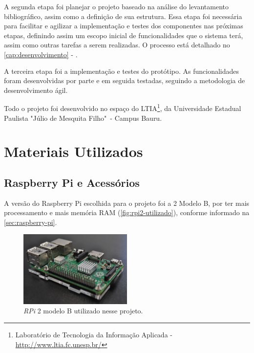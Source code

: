 \documentclass[
		12pt,				%
		openright,			%
		oneside,			%
		a4paper,			%
		chapter=TITLE,		%
		english,			%
		brazil				%
	]{abntex2}
\begin{document}
A segunda etapa foi planejar o projeto baseado na análise do levantamento bibliográfico, assim como a definição de sua estrutura. Essa etapa foi necessária para facilitar e agilizar a implementação e testes dos componentes nas próximas etapas, definindo assim um escopo inicial de funcionalidades que o sistema terá, assim como outras tarefas a serem realizadas. O processo está detalhado no \autoref{cap:desenvolvimento} - .

A terceira etapa foi a implementação e testes do protótipo. As funcionalidades foram desenvolvidas por parte e em seguida testadas, seguindo a metodologia de desenvolvimento ágil.

Todo o projeto foi desenvolvido no espaço do LTIA\footnote{Laboratório de Tecnologia da Informação Aplicada - \url{http://www.ltia.fc.unesp.br/}}, da Universidade Estadual Paulista "Júlio de Mesquita Filho"\ - Campus Bauru.


\section{Materiais Utilizados}\label{sec:materiais-utilizados}

\subsection{Raspberry Pi e Acessórios}\label{sec:rpi-acessorios}

A versão do Raspberry Pi escolhida para o projeto foi a 2 Modelo B, por ter mais processamento e mais memória RAM (\autoref{fig:rpi2-utilizado}), conforme informado na \autoref{sec:raspberry-pi}.

\begin{figure}[htb]
	\caption{\label{fig:rpi2-utilizado}\textit{RPi} 2 modelo B utilizado nesse projeto.}
	\begin{center}
		\includegraphics[width=0.5\textwidth]{img/rpi2.jpg}
	\end{center}
\end{figure}
\end{document}
